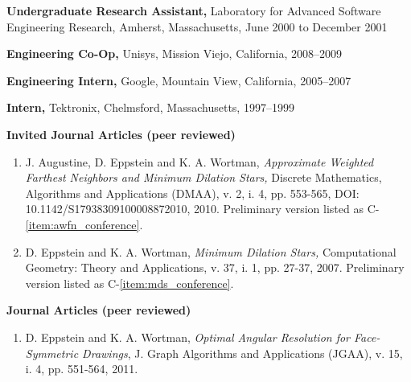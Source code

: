 \documentclass[11pt]{letter}
\begin{document}
\textbf{Undergraduate Research Assistant,} Laboratory for Advanced Software Engineering Research, Amherst, Massachusetts, June 2000 to December 2001


\textbf{Engineering Co-Op,} Unisys, Mission Viejo, California, 2008--2009 %

\textbf{Engineering Intern,} Google, Mountain View, California, 2005--2007 %

\textbf{Intern,} Tektronix, Chelmsford, Massachusetts, 1997--1999 %

\clearpage
{}

\renewcommand{\labelenumi}{I-\arabic{enumi}.}
\textbf{Invited Journal Articles (peer reviewed)}
\begin{enumerate}
\item \label{item:awfn_journal} J. Augustine, D. Eppstein and K. A. Wortman, \emph{Approximate Weighted Farthest Neighbors and Minimum Dilation Stars,} Discrete Mathematics, Algorithms and Applications (DMAA), v. 2, i. 4, pp. 553-565, DOI: 10.1142/S17938309100008872010, 2010.  Preliminary version listed as C-\ref{item:awfn_conference}.
\item \label{item:mds_journal} D. Eppstein and K. A. Wortman, \emph{Minimum Dilation Stars,} Computational Geometry: Theory and Applications, v. 37, i. 1, pp. 27-37, 2007.  Preliminary version listed as C-\ref{item:mds_conference}.
\end{enumerate}

\renewcommand{\labelenumi}{J-\arabic{enumi}.}
\textbf{Journal Articles (peer reviewed)}
\begin{enumerate}
\item \label{item:oarpdsf_journal} D. Eppstein and K. A. Wortman, \emph{Optimal Angular Resolution for Face-Symmetric Drawings}, J. Graph Algorithms and Applications (JGAA), v. 15, i. 4, pp. 551-564, 2011.
\end{enumerate}
\end{document}

